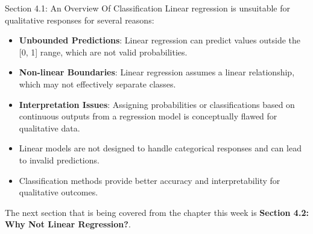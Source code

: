 \begin{notes}{Section 4.1: An Overview Of Classification}
    Linear regression is unsuitable for qualitative responses for several reasons:
    \begin{itemize}
        \item \textbf{Unbounded Predictions}: Linear regression can predict values outside the [0, 1] range, which are not valid probabilities.
        \item \textbf{Non-linear Boundaries}: Linear regression assumes a linear relationship, which may not effectively separate classes.
        \item \textbf{Interpretation Issues}: Assigning probabilities or classifications based on continuous outputs from a regression model is conceptually flawed for qualitative data.
    \end{itemize}
    
    \begin{highlight}
        \begin{itemize}
            \item Linear models are not designed to handle categorical responses and can lead to invalid predictions.
            \item Classification methods provide better accuracy and interpretability for qualitative outcomes.
        \end{itemize}
    \end{highlight}
\end{notes}

The next section that is being covered from the chapter this week is \textbf{Section 4.2: Why Not Linear Regression?}.

